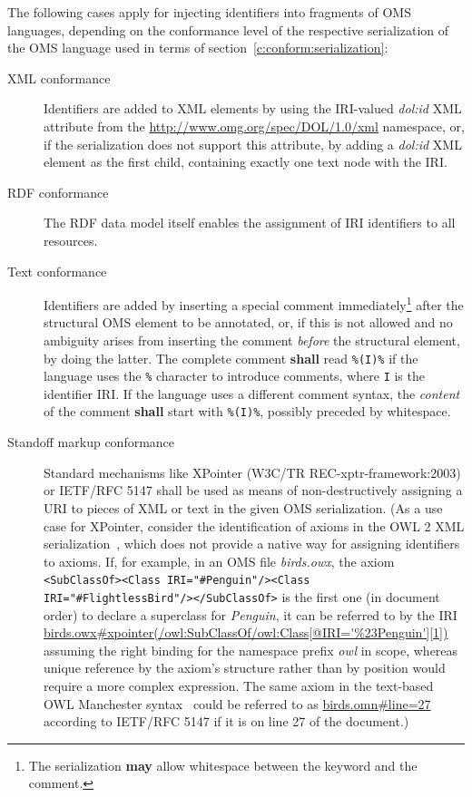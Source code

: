 \documentclass[10pt,fleqn,final]{scrreprt}
\newcommand*{\shall}{\textbf{shall}\xspace}
\newcommand*{\may}{\textbf{may}\xspace}
\newcommand{\nisref}[1]{#1}
\newenvironment{definitions}[0]{\medskip }{}
\begin{document}
\begin{definitions}
The following cases apply for injecting identifiers into fragments of OMS languages, depending on the conformance level of the respective serialization of the OMS language used in terms of section~\ref{c:conform:serialization}:
\begin{description}
\item[XML conformance] Identifiers are added to XML elements by using the IRI-valued \textit{dol:id} XML attribute from the \url{http://www.omg.org/spec/DOL/1.0/xml} namespace, or, if the serialization does not support this attribute, by adding a \textit{dol:id} XML element as the first child, containing exactly one text node with the IRI.
\item[RDF conformance] The RDF data model itself enables the assignment of IRI identifiers to all resources.
\item[Text conformance] Identifiers are added by inserting a special comment immediately\footnote{The serialization \may allow whitespace between the keyword and the comment.} after the structural OMS element to be annotated, or, if this is not allowed and no ambiguity arises from inserting the comment \emph{before} the structural element, by doing the latter.  The complete comment \shall read \texttt{\%(I)\%} if the language uses the \texttt{\%} character to introduce comments, where \texttt{I} is the identifier IRI.  If the language uses a different comment syntax, the \emph{content} of the comment \shall start with \texttt{\%(I)\%}, possibly preceded by whitespace.
\item[Standoff markup conformance] Standard mechanisms like XPointer (\nisref{W3C/TR REC-xptr-framework:2003}) or \nisref{IETF/RFC 5147} shall be used as means of non-destructively assigning a URI to pieces of XML or text in the given OMS serialization.  { (As a use case for XPointer, consider the identification of axioms in the OWL 2 XML serialization~\cite{W3C:REC-owl2-xml-serialization-20121211}, which does not provide a native way for assigning identifiers to axioms.  If, for example, in an OMS file \textit{birds.owx}, the axiom \texttt{<SubClassOf><Class IRI="\#Penguin"/><Class IRI="\#FlightlessBird"/></SubClassOf>} is the first one (in document order) to declare a superclass for \textit{Penguin}, it can be referred to by the IRI \url{birds.owx\#xpointer(/owl:SubClassOf/owl:Class[@IRI='\%23Penguin'][1])} assuming the right binding for the namespace prefix \textit{owl} in scope, whereas unique reference by the axiom's structure rather than by position would require a more complex expression.
The same axiom in the text-based OWL Manchester syntax~\cite{W3C:NOTE-owl2-manchester-syntax-20091027} could be referred to as \url{birds.omn\#line=27} according to \nisref{IETF/RFC 5147} if it is on line 27 of the document.)}
\end{description}


\end{definitions}
\end{document}
